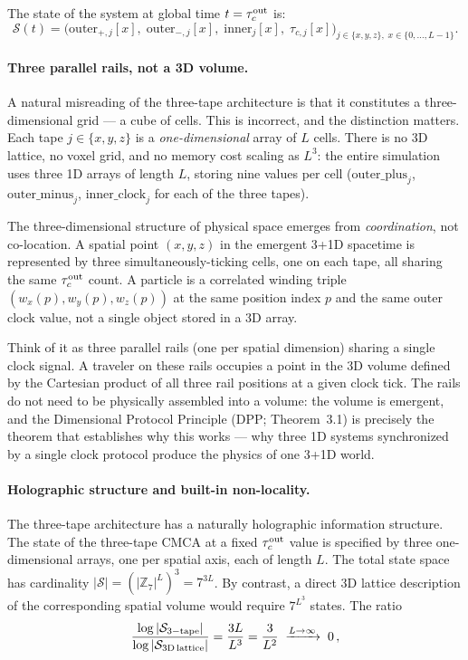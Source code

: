 \documentclass[11pt]{article}
\theoremstyle{remark}
\newcommand{\taucout}{\tau_c^{\rm out}}
\begin{document}
The state of the system at global time $t = \taucout$ is:
\begin{equation}
  \mathcal{S}(t) = \bigl(\text{outer}_{+,j}[x],\;
  \text{outer}_{-,j}[x],\;
  \text{inner}_{j}[x],\;
  \tau_{c,j}[x]\bigr)_{j\in\{x,y,z\},\; x\in\{0,\ldots,L-1\}}.
\end{equation}

\paragraph{Three parallel rails, not a 3D volume.}
A natural misreading of the three-tape architecture is that it constitutes a
three-dimensional grid --- a cube of cells. This is incorrect, and the distinction
matters. Each tape $j \in \{x, y, z\}$ is a \emph{one-dimensional} array of
$L$ cells. There is no 3D lattice, no voxel grid, and no memory cost scaling as
$L^3$: the entire simulation uses three 1D arrays of length $L$, storing nine
values per cell ($\text{outer\_plus}_j$, $\text{outer\_minus}_j$,
$\text{inner\_clock}_j$ for each of the three tapes).

The three-dimensional structure of physical space emerges from \emph{coordination},
not co-location. A spatial point $(x, y, z)$ in the emergent 3+1D spacetime is
represented by three simultaneously-ticking cells, one on each tape, all sharing
the same $\tau_c^{\rm out}$ count. A particle is a correlated winding triple
$(w_x(p), w_y(p), w_z(p))$ at the same position index $p$ and the same outer
clock value, not a single object stored in a 3D array.

Think of it as three parallel rails (one per spatial dimension) sharing a
single clock signal. A traveler on these rails occupies a point in the 3D
volume defined by the Cartesian product of all three rail positions at a given
clock tick. The rails do not need to be physically assembled into a volume: the
volume is emergent, and the Dimensional Protocol Principle (DPP; Theorem~3.1)
is precisely the theorem that establishes why this works --- why three 1D systems
synchronized by a single clock protocol produce the physics of one 3+1D world.



\paragraph{Holographic structure and built-in non-locality.}
\label{sec:holographic}
The three-tape architecture has a naturally holographic information structure. The state
of the three-tape CMCA at a fixed $\taucout$ value is specified by three one-dimensional
arrays, one per spatial axis, each of length $L$. The total state space has cardinality
$|\mathcal{S}| = (|\mathbb{Z}_7|^L)^3 = 7^{3L}$. By contrast, a direct 3D lattice
description of the corresponding spatial volume would require $7^{L^3}$ states. The ratio
\begin{equation}
  \frac{\log|\mathcal{S}_{\rm 3-tape}|}{\log|\mathcal{S}_{\rm 3D\,lattice}|}
  = \frac{3L}{L^3} = \frac{3}{L^2} \;\xrightarrow{L\to\infty}\; 0 \,,
\end{equation}
\end{document}
